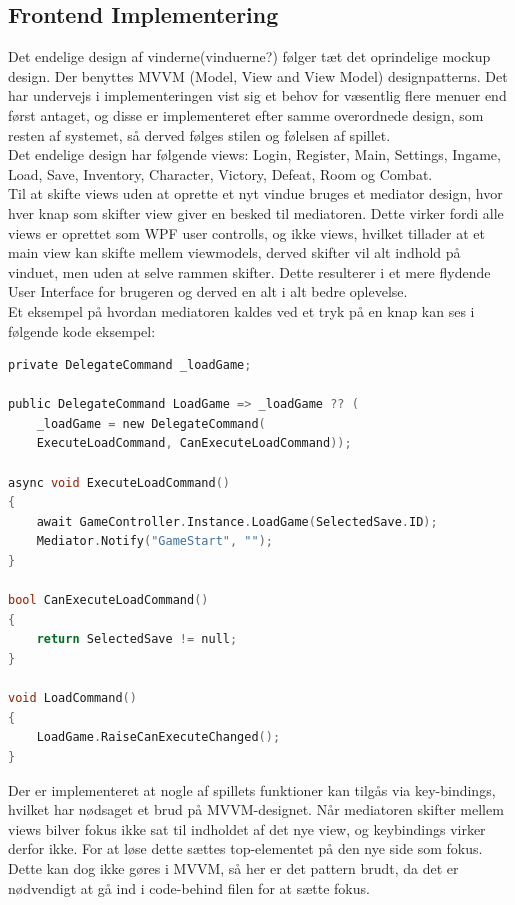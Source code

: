 \subsection{Frontend Implementering}
\label{sec:Frontend Implementering}
Det endelige design af vinderne(vinduerne?) følger tæt det oprindelige mockup design. Der benyttes MVVM (Model, View and View Model) designpatterns.  Det har undervejs i implementeringen vist sig et behov for væsentlig flere menuer end først antaget, og disse er implementeret efter samme overordnede design, som resten af systemet, så derved følges stilen og følelsen af spillet.\\
Det endelige design har følgende views:
Login, Register, Main, Settings, Ingame, Load, Save, Inventory, Character, Victory, Defeat, Room og Combat.\\
Til at skifte views uden at oprette et nyt vindue bruges et mediator design, hvor hver knap som skifter view giver en besked til mediatoren. Dette virker fordi alle views er oprettet som WPF user controlls, og ikke views, hvilket tillader at et main view kan skifte mellem viewmodels, derved skifter vil alt indhold på vinduet, men uden at selve rammen skifter. Dette resulterer i et mere flydende User Interface for brugeren og derved en alt i alt bedre oplevelse. \cite{Mediator}\\
Et eksempel på hvordan mediatoren kaldes ved et tryk på en knap kan ses i følgende kode eksempel:

\begin{lstlisting}[language=c]
private DelegateCommand _loadGame;
    
public DelegateCommand LoadGame => _loadGame ?? (
	_loadGame = new DelegateCommand(
	ExecuteLoadCommand, CanExecuteLoadCommand));

async void ExecuteLoadCommand()
{
    await GameController.Instance.LoadGame(SelectedSave.ID);
    Mediator.Notify("GameStart", "");
}

bool CanExecuteLoadCommand()
{
    return SelectedSave != null;
}

void LoadCommand()
{
    LoadGame.RaiseCanExecuteChanged();
}
\end{lstlisting}

\noindent Der er implementeret at nogle af spillets funktioner kan tilgås via key-bindings, hvilket har nødsaget et brud på MVVM-designet. Når mediatoren skifter mellem views bilver fokus ikke sat til indholdet af det nye view, og keybindings virker derfor ikke. For at løse dette sættes top-elementet på den nye side som fokus. Dette kan dog ikke gøres i MVVM, så her er det pattern brudt, da det er nødvendigt at gå ind i code-behind filen for at sætte fokus.

